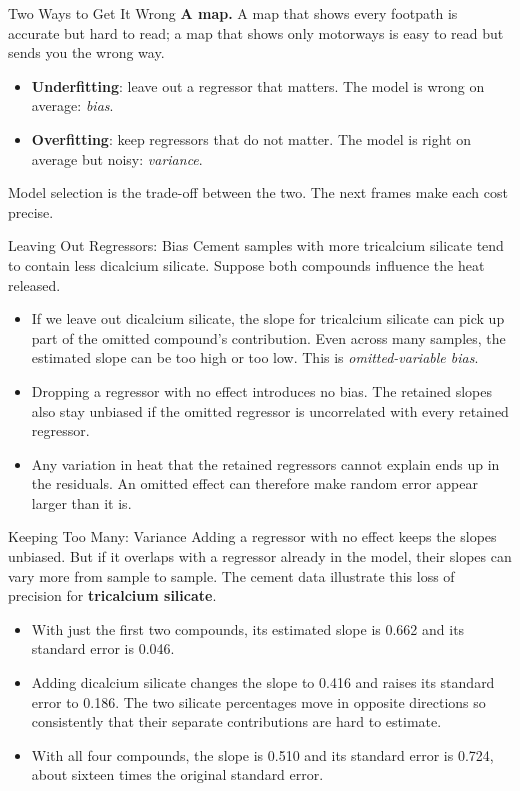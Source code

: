 \begin{frame}{Two Ways to Get It Wrong}
    \textbf{A map.} A map that shows every footpath is accurate but hard to read; a map that shows only motorways is easy to read but sends you the wrong way.
    \svspace{0.5em}
    \begin{itemize}
        \item \textbf{Underfitting}: leave out a regressor that matters. The model is wrong on average: \emph{bias}.
        \item \textbf{Overfitting}: keep regressors that do not matter. The model is right on average but noisy: \emph{variance}.
    \end{itemize}
    \svspace{0.5em}
    Model selection is the trade-off between the two. The next frames make each cost precise.
\end{frame}


\begin{frame}{Leaving Out Regressors: Bias}
    Cement samples with more tricalcium silicate tend to contain less dicalcium silicate. Suppose both compounds influence the heat released.
    \begin{itemize}
        \item If we leave out dicalcium silicate, the slope for tricalcium silicate can pick up part of the omitted compound's contribution. Even across many samples, the estimated slope can be too high or too low. This is \emph{omitted-variable bias}.
        \item Dropping a regressor with no effect introduces no bias. The retained slopes also stay unbiased if the omitted regressor is uncorrelated with every retained regressor.
        \item Any variation in heat that the retained regressors cannot explain ends up in the residuals. An omitted effect can therefore make random error appear larger than it is.
    \end{itemize}
\end{frame}


\begin{frame}{Keeping Too Many: Variance}
    Adding a regressor with no effect keeps the slopes unbiased. But if it overlaps with a regressor already in the model, their slopes can vary more from sample to sample.
    \svspace{0.5em}
    The cement data illustrate this loss of precision for \textbf{tricalcium silicate}.
    \begin{itemize}
        \item With just the first two compounds, its estimated slope is 0.662 and its standard error is 0.046.
        \item Adding dicalcium silicate changes the slope to 0.416 and raises its standard error to 0.186. The two silicate percentages move in opposite directions so consistently that their separate contributions are hard to estimate.
        \item With all four compounds, the slope is 0.510 and its standard error is 0.724, about sixteen times the original standard error.
    \end{itemize}
\end{frame}


